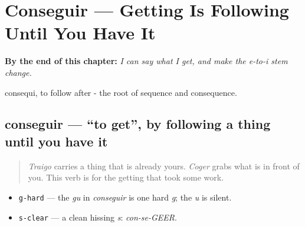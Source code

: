 
\chapter{Conseguir --- Getting Is Following Until You Have It}
\label{ch:spanish-conseguir}

\begin{chapteropening}
\textbf{By the end of this chapter:} \emph{I can say what I get, and make the e-to-i stem change.}

consequi, to follow after - the root of sequence and consequence.
\end{chapteropening}

\section[conseguir]{conseguir — \textquotedblleft{}to get\textquotedblright{}, by following a thing until you have it}

\label{lesson:ES-C39-conseguir}



\begin{quote}
\emph{Traigo} carries a thing that is already yours. \emph{Coger} grabs what is in front of you. This verb is for the getting that took some work.
\end{quote}

\begin{sounds}
\begin{itemize}
\raggedright
  \item \texttt{g-hard} — the \emph{gu} in \emph{conseguir} is one hard \emph{g}; the \emph{u} is silent.
  \item \texttt{s-clear} — a clean hissing \emph{s}: \emph{con-se-GEER}.
\end{itemize}
\end{sounds}

